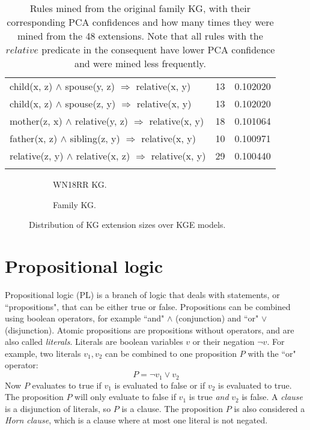 \begin{longtable}{lrr}
     child(x, z) $\wedge$ spouse(y, z)   $\Rightarrow$ relative(x, y) &           13 &        0.102020 \\
     child(x, z) $\wedge$ spouse(z, y)   $\Rightarrow$ relative(x, y) &           13 &        0.102020 \\
  mother(z, x) $\wedge$ relative(y, z)   $\Rightarrow$ relative(x, y) &           18 &        0.101064 \\
   father(x, z) $\wedge$ sibling(z, y)   $\Rightarrow$ relative(x, y) &           10 &        0.100971 \\
relative(z, y) $\wedge$ relative(x, z)   $\Rightarrow$ relative(x, y) &           29 &        0.100440 \\
\bottomrule
\caption[Rules mined from the original family KG]{Rules mined from the original family KG, with their corresponding PCA confidences and how many times they were mined from the 48 extensions. Note that all rules with the $relative$ predicate in the consequent have lower PCA confidence and were mined less frequently.}
\label{family_original_rules_table_PCA}
\end{longtable}


\begin{figure}[htb]
\centering
\begin{subfigure}{.5\textwidth}
  \centering
  
  \caption{WN18RR KG.}
  \label{fig:model_extension_wn18rr_boxplot_sub}
\end{subfigure}%
\begin{subfigure}{.5\textwidth}
  \centering
  
  \caption{Family KG.}
  \label{fig:model_extension_family_boxplot_sub}
\end{subfigure}
\caption{Distribution of KG extension sizes over KGE models.}
\label{model_extensions_boxplot}
\end{figure}


\section{Propositional logic}
\label{propositional_logic}
Propositional logic (PL) is a branch of logic that deals with statements, or ``propositions", that can be either true or false. Propositions can be combined using boolean operators, for example ``and" $\wedge$ (conjunction) and ``or" $\vee$ (disjunction). Atomic propositions are propositions without operators, and are also called \textit{literals}. Literals are boolean variables $v$ or their negation $\neg v$. For example, two literals $v_1, v_2$ can be combined to one proposition $P$ with the ``or" operator:
\[P = \neg v_1 \vee v_2\]
Now $P$ evaluates to true if $v_1$ is evaluated to false or if $v_2$ is evaluated to true. The proposition $P$ will only evaluate to false if $v_1$ is true \textit{and} $v_2$ is false. A \textit{clause} is a disjunction of literals, so $P$ is a clause. The proposition $P$ is also considered a \textit{Horn clause}, which is a clause where at most one literal is not negated. 

